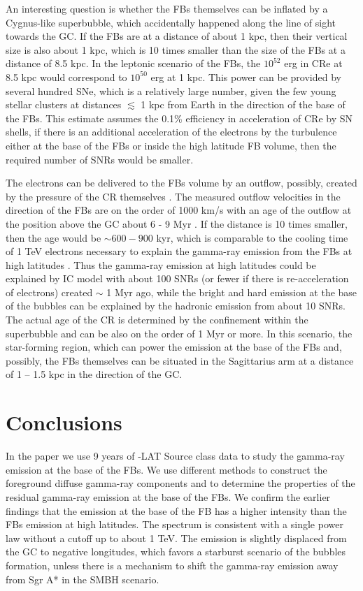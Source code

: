 An interesting question is whether the FBs themselves can be inflated by a Cygnus-like superbubble,
which accidentally happened along the line of sight towards the GC.
If the FBs are at a distance of about 1 kpc, then their vertical size is also about 1 kpc,
which is 10 times smaller than the size of the FBs at a distance of 8.5 kpc.
In the leptonic scenario of the FBs, the $10^{52}$ erg in CRe at 8.5 kpc \citep{2014ApJ...793...64A}
would correspond to $10^{50}$ erg at 1 kpc.
This power can be provided by several hundred SNe, which is a relatively large number, given the few young stellar 
clusters at distances $\lesssim$ 1 kpc from Earth in the direction of the base of the FBs.
This estimate assumes the 0.1\% efficiency in acceleration of CRe by SN shells,
if there is an additional acceleration of the electrons by the turbulence either at the base of the FBs
or inside the high latitude FB volume, then the required number of SNRs would be smaller.

The electrons can be delivered to the FBs volume by an outflow,
possibly, created by the pressure of the CR themselves \citep[e.g.,][]{2018MNRAS.475..570J}.
The measured outflow velocities in the direction of the FBs are on the order of 1000 km/s
with an age of the outflow at the position above the GC about 6 - 9 Myr \citep{2015ApJ...799L...7F, 2017ApJ...834..191B}.
If the distance is 10 times smaller, then the age would be $\sim 600 - 900$ kyr,
which is comparable to the cooling time of 1 TeV electrons necessary to explain the 
gamma-ray emission from the FBs at high latitudes \citep{2014ApJ...793...64A}.
Thus the gamma-ray emission at high latitudes could be explained by IC model with about 100 SNRs
(or fewer if there is re-acceleration of electrons)
created $\sim$ 1 Myr ago, while the bright and hard emission at the base of the bubbles can
be explained by the hadronic emission from about 10 SNRs. 
The actual age of the CR is determined by the confinement within the superbubble and can be also on the order
of 1 Myr or more.
In this scenario,
the star-forming region, which can power the emission at the base of the FBs and, possibly, the FBs themselves
can be situated in the Sagittarius arm at a distance of 1 -- 1.5 kpc in the direction of the GC.


\section{Conclusions}

In the paper we use 9 years of \Fermi-LAT Source class data to study the gamma-ray emission
at the base of the FBs.
We use different methods to construct the foreground diffuse gamma-ray components and to determine
the properties of the residual gamma-ray emission at the base of the FBs.
We confirm the earlier findings that the emission at the base of the FB
has a higher intensity than the FBs emission at high latitudes.
The spectrum is consistent with a single power law without a cutoff up to about 1 TeV.
The emission is slightly displaced from the GC to negative longitudes,
which favors a starburst scenario of the bubbles formation, unless there is a mechanism to shift the
gamma-ray emission away from Sgr A* in the SMBH scenario.

